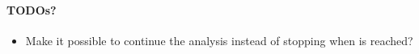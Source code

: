 \paragraph{TODOs?}
\begin{itemize}
\item Make it possible to continue the analysis instead of stopping when  is reached?
\end{itemize}
